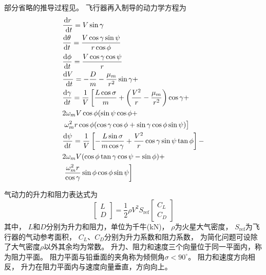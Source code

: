 部分省略的推导过程见\cite{mdelong2006}。
飞行器再入制导的动力学方程为
\begin{align}
    &\frac{\mathrm{d} r}{\mathrm{~d} t}=V \sin \gamma \notag\\
    &\frac{\mathrm{d} \theta}{\mathrm{d} t}=\frac{V \cos \gamma \sin \psi}{r \cos \phi} \notag\\
    &\frac{\mathrm{d} \phi}{\mathrm{d} t}=\frac{V \cos \gamma \cos \psi}{r} \notag\\
    &\frac{\mathrm{d} V}{\mathrm{~d} t}=-\frac{D}{m}-\frac{\mu_{m}}{r^{2}} \sin \gamma+ \notag\\
    &\frac{\mathrm{d} \gamma}{\mathrm{d} t}=\frac{1}{V}\left[\frac{L \cos \sigma}{m}+\left(\frac{V^{2}}{r}-\frac{\mu_{m}}{r^{2}}\right) \cos \gamma+\right. \notag\\
    &2 \omega_{m} V \cos \phi(\sin \psi \cos \phi+ \notag\\
    &\left.\omega_{m}^{2} r \cos \phi(\cos \gamma \cos \phi+\sin \gamma \cos \phi \sin \psi)\right] \notag\\
    &\frac{\mathrm{d} \psi}{\mathrm{d} t}=\frac{1}{V}\left[-\frac{L \sin \sigma}{m \cos \gamma}+\frac{V^{2}}{r} \cos \gamma \sin \psi \tan \phi\right]- \notag\\
    &2 \omega_{m} V(\cos \phi \tan \gamma \cos \psi-\sin \phi)+ \notag\\
    &\left.\frac{\omega_{m}^{2} r}{\cos \gamma} \sin \phi \cos \phi \sin \psi\right] \label{eqModelTotal}
\end{align}

气动力的升力和阻力表达式为
\begin{equation*}
    \left[\begin{matrix}
        L \\ D
    \end{matrix}\right]
    = \frac{1}{2}\rho V^2S_{\text{ref}}
    \left[\begin{matrix}
        C_L \\ C_D
    \end{matrix}\right]
\end{equation*}
其中，
$L$和$D$分别为升力和阻力，单位为千牛(kN)，
$\rho$为火星大气密度，
$S_{\text{ref}}$为飞行器的气动参考面积，
$C_L$、$C_D$分别为升力系数和阻力系数，
为简化问题可设除了大气密度$\rho$以外其余均为常数。
升力、阻力和速度三个向量位于同一平面内，称为阻力平面。
阻力平面与铅垂面的夹角称为倾侧角$\sigma<90^{\circ}$。
阻力和速度方向相反，
升力在阻力平面内与速度向量垂直，方向向上。

